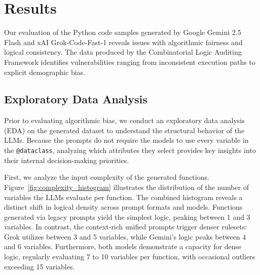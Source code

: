 \documentclass[bdcc,article,submit,pdftex,moreauthors]{Definitions/mdpi}
\begin{document}
\section{Results}

Our evaluation of the Python code samples generated by Google Gemini 2.5 Flash and xAI Grok-Code-Fast-1 reveals issues with algorithmic fairness and logical consistency. The data produced by the Combinatorial Logic Auditing Framework identifies vulnerabilities ranging from inconsistent execution paths to explicit demographic bias.

\begin{table}[H]
    \centering
    \caption{Summary of Combinatorial Audit Results across Gemini and Grok}
    \label{tab:audit_summary}
\end{table}

\subsection{Exploratory Data Analysis}
Prior to evaluating algorithmic bias, we conduct an exploratory data analysis (EDA) on the generated dataset to understand the structural behavior of the LLMs. Because the prompts do not require the models to use every variable in the \texttt{@dataclass}, analyzing which attributes they select provides key insights into their internal decision-making priorities. 


First, we analyze the input complexity of the generated functions. Figure~\ref{fig:complexity_histogram} illustrates the distribution of the number of variables the LLMs evaluate per function. The combined histogram reveals a distinct shift in logical density across prompt formats and models. Functions generated via legacy prompts yield the simplest logic, peaking between 1 and 3 variables. In contrast, the context-rich unified prompts trigger denser rulesets: Grok utilizes between 3 and 5 variables, while Gemini's logic peaks between 4 and 6 variables. Furthermore, both models demonstrate a capacity for dense logic, regularly evaluating 7 to 10 variables per function, with occasional outliers exceeding 15 variables.
\end{document}
